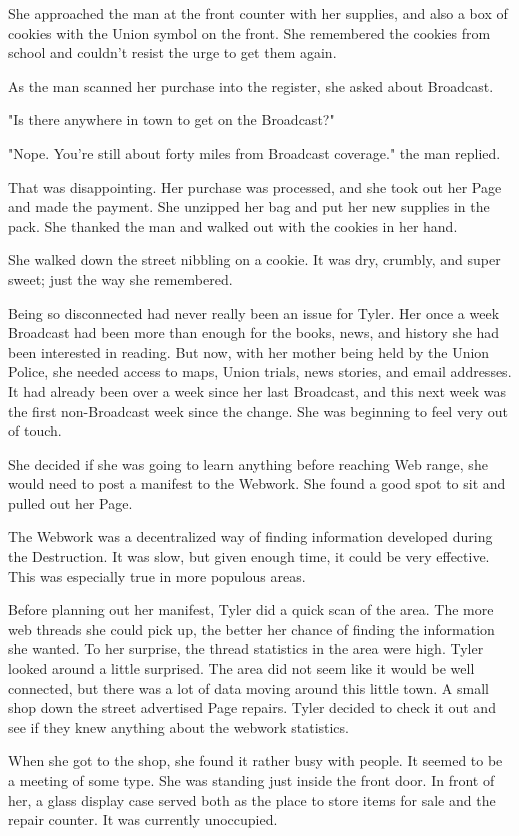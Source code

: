 \documentclass[courier]{sffms}
\begin{document}
She approached the man at the front counter with her
supplies, and also a box of cookies with the Union symbol
on the front. She remembered the cookies from school and
couldn't resist the urge to get them again.

As the man scanned her purchase into the register, she
asked about Broadcast.

"Is there anywhere in town to get on the Broadcast?"

"Nope. You're still about forty miles from Broadcast coverage."
the man replied.

That was disappointing. Her purchase was processed, and 
she took out her Page and made the payment. She unzipped
her bag and put her new supplies in the pack. She thanked
the man and walked out with the cookies in her hand.

She walked down the street nibbling on a cookie. It was dry,
crumbly, and super sweet; just the way she remembered.

Being so disconnected had never really been an issue for
Tyler. Her once a week Broadcast had been more than
enough for the books, news, and history she had been
interested in reading. But now, with her mother being held
by the Union Police, she needed access to maps, Union
trials, news stories, and email addresses. It had already
been over a week since her last Broadcast, and this next
week was the first non-Broadcast week since the change.
She was beginning to feel very out of touch.

She decided if she was going to learn anything before
reaching Web range, she would need to post a manifest
to the Webwork. She found a good spot to sit and pulled
out her Page.

The Webwork was a decentralized way of finding information
developed during the Destruction. It was slow, but given
enough time, it could be very effective. This was especially
true in more populous areas.

Before planning out her manifest, Tyler did a quick scan of 
the area. The more web threads she could pick up, the
better her chance of finding the information she wanted.
To her surprise, the thread statistics in the area were high.
Tyler looked around a little surprised. The area did not seem
like it would be well connected, but there was a lot of data
moving around this little town. A small shop down the street
advertised Page repairs. Tyler decided to check it out and see
if they knew anything about the webwork statistics.

When she got to the shop, she found it rather busy with
people. It seemed to be a meeting of some type. She was
standing just inside the front door. In front of her, a glass
display case served both as the place to store items for
sale and the repair counter. It was currently unoccupied.
\end{document}
